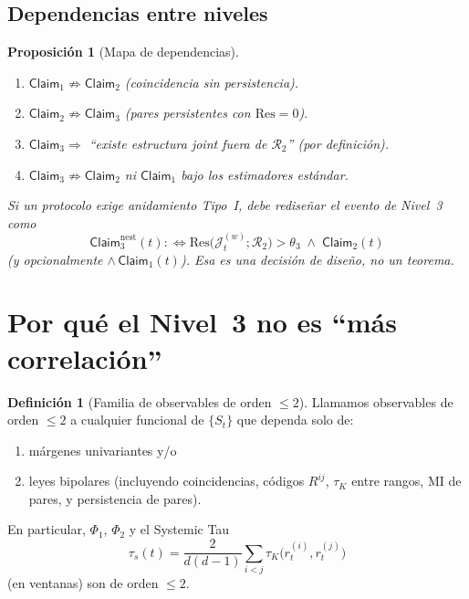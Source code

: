 \documentclass[11pt,a4paper]{article}
\theoremstyle{definition}
\newtheorem{definition}{Definici\'on}[section]
\theoremstyle{plain}
\newtheorem{proposition}{Proposici\'on}[section]
\theoremstyle{remark}
\newcommand{\Res}{\mathrm{Res}}
\newcommand{\Rtwo}{\mathcal{R}_2}
\newcommand{\Jwin}{\mathcal{J}}
\newcommand{\claim}{\mathsf{Claim}}
\begin{document}
\subsection{Dependencias entre niveles}

\begin{proposition}[Mapa de dependencias]
\label{prop:deps}
\begin{enumerate}[label=(\roman*)]
  \item $\claim_1\not\Rightarrow\claim_2$ (coincidencia sin persistencia).
  \item $\claim_2\not\Rightarrow\claim_3$ (pares persistentes con
  $\Res=0$).
  \item $\claim_3\Rightarrow$ ``existe estructura joint fuera de
  $\Rtwo$'' (por definici\'on).
  \item $\claim_3\not\Rightarrow\claim_2$ ni $\claim_1$ bajo los
  estimadores est\'andar.
\end{enumerate}
Si un protocolo exige anidamiento Tipo~I, debe \emph{redise\~nar} el
evento de Nivel~3 como
\begin{equation}
\label{eq:forced_nest}
\claim_3^{\mathrm{nest}}(t)
:\iff
\Res\bigl(\Jwin_t^{(w)};\Rtwo\bigr)>\theta_3
\;\wedge\;
\claim_2(t)
\end{equation}
(y opcionalmente $\wedge\,\claim_1(t)$). Esa es una decisi\'on de
dise\~no, no un teorema.
\end{proposition}

\section{Por qu\'e el Nivel~3 no es ``m\'as correlaci\'on''}
\label{sec:not_more_corr}

\begin{definition}[Familia de observables de orden $\le 2$]
\label{def:order2_obs}
Llamamos observables de orden $\le 2$ a cualquier funcional de
$\{S_t\}$ que dependa solo de:
\begin{enumerate}[label=(\alph*)]
  \item m\'argenes univariantes y/o
  \item leyes bipolares (incluyendo coincidencias, c\'odigos $R^{ij}$,
  $\tau_K$ entre rangos, MI de pares, y persistencia de pares).
\end{enumerate}
En particular, $\Phi_1$, $\Phi_2$ y el Systemic Tau
\[
\tau_s(t)
=\frac{2}{d(d-1)}\sum_{i<j}\tau_K\bigl(r^{(i)}_t,r^{(j)}_t\bigr)
\]
(en ventanas) son de orden $\le 2$.
\end{definition}
\end{document}
